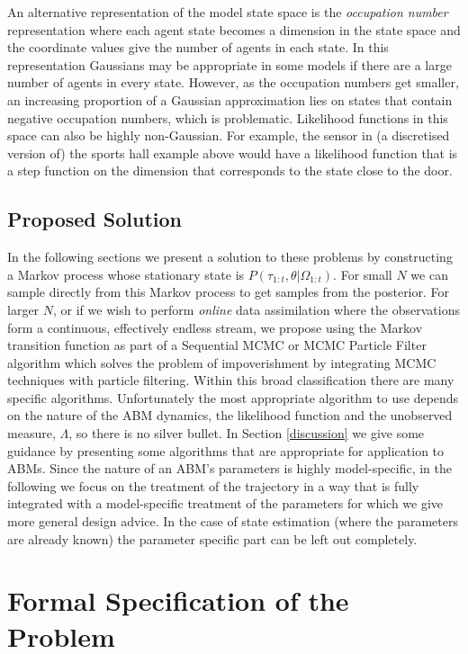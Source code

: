 \documentclass{article}
\begin{document}
An alternative representation of the model state space is the \textit{occupation number} representation where each agent state becomes a dimension in the state space and the coordinate values give the number of agents in each state. In this representation Gaussians may be appropriate in some models if there are a large number of agents in every state. However, as the occupation numbers get smaller, an increasing proportion of a Gaussian approximation lies on states that contain negative occupation numbers, which is problematic. Likelihood functions in this space can also be highly non-Gaussian. For example, the sensor in (a discretised version of) the sports hall example above would have a likelihood function that is a step function on the dimension that corresponds to the state close to the door.

\subsection{Proposed Solution}

In the following sections we present a solution to these problems by constructing a Markov process whose stationary state is $P(\tau_{1:t},\theta|\Omega_{1:t})$. For small $N$ we can sample directly from this Markov process to get samples from the posterior. For larger $N$, or if we wish to perform \textit{online} data assimilation where the observations form a continuous, effectively endless stream, we propose using the Markov transition function as part of a Sequential MCMC or MCMC Particle Filter algorithm \citep*{finke2020limit, septier2009mcmc} which solves the problem of impoverishment by integrating MCMC techniques with particle filtering. Within this broad classification there are many specific algorithms. Unfortunately the most appropriate algorithm to use depends on the nature of the ABM dynamics, the likelihood function and the unobserved measure, $\Lambda$, so there is no silver bullet. In Section \ref{discussion} we give some guidance by presenting some algorithms that are appropriate for application to ABMs. Since the nature of an ABM's parameters is highly model-specific, in the following we focus on the treatment of the trajectory in a way that is fully integrated with a model-specific treatment of the parameters for which we give more general design advice. In the case of state estimation (where the parameters are already known) the parameter specific part can be left out completely.

\section{Formal Specification of the Problem}\label{sec:formulation}
\end{document}
